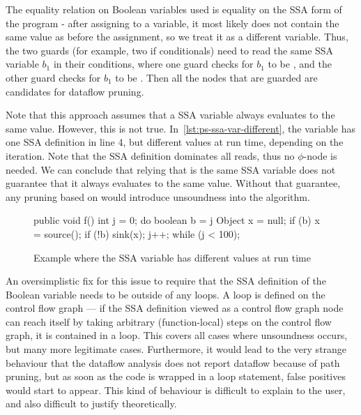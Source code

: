 The equality relation on Boolean variables used is equality on the 
SSA form of the program - after assigning to a variable, it most likely does not
contain the same value as before the assignment, so we treat it as a different variable.
Thus, the two guards (for example, two if conditionals) need to read the same SSA 
variable $b_1$ in their conditions, where one guard checks for $b_1$ to be ,
and the other guard checks for $b_1$ to be .
Then all the nodes that are guarded are candidates for dataflow pruning.

Note that this approach assumes that a SSA variable always evaluates 
to the same value.
However, this is not true.
In~\autoref{lst:ps-ssa-var-different}, the variable  has one SSA definition 
in line 4, but different values at run time, depending on the iteration.
Note that the SSA definition dominates all reads, thus no $\phi$-node is
needed.
We can conclude that relying that  is the same SSA variable 
does not guarantee 
that it always evaluates to the same value.
Without that guarantee, any pruning based on  would introduce 
unsoundness into the algorithm.

\begin{figure}
    \begin{javacode}
public void f() {
    int j = 0;
    do {
        boolean b = j %
        Object x = null;
        if (b) {
            x = source();
        }
        if (!b) {
            sink(x);
        }
        j++;
    } while (j < 100);
}
    \end{javacode}
    \caption{Example where the SSA variable  has different values at run time}
    \label{lst:ps-ssa-var-different}
\end{figure}

An oversimplistic fix for this issue to require that the SSA definition of the
Boolean variable needs to be outside of any loops.
A loop is defined on the control flow graph ---
if the SSA definition viewed as a control flow graph node can reach itself by taking
arbitrary (function-local) steps on the control flow graph, it is contained in a loop.
This covers all cases where unsoundness occurs, but many more legitimate cases.
Furthermore, it would lead to the very strange behaviour that the dataflow analysis 
does not report dataflow because of path pruning, but as soon as the code is 
wrapped in a loop statement, false positives would start to appear.
This kind of behaviour is difficult to explain to the user, and also difficult
to justify theoretically.

